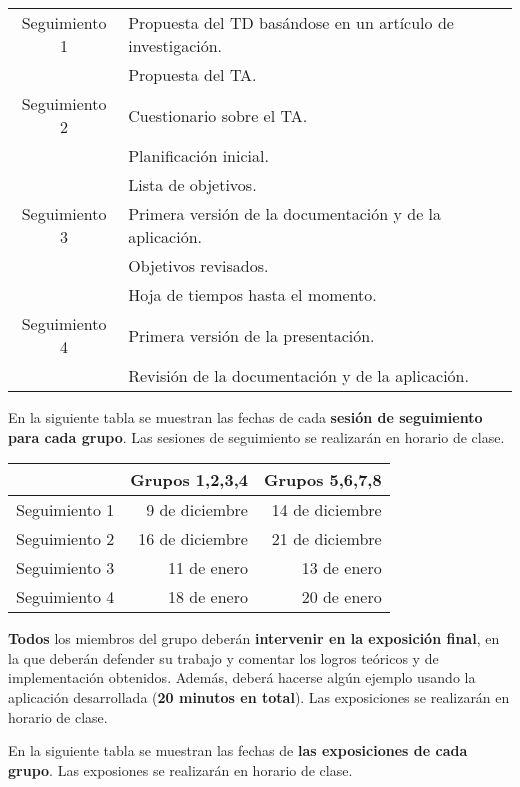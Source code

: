 \documentclass[a4paper]{article}
\begin{document}
    \begin{center}
    \begin{tabular}{|c||l|}
    \hline
  Seguimiento 1 & Propuesta del TD basándose en un artículo de  investigación.  \\
  & Propuesta del TA. \\
\hline
Seguimiento 2  & Cuestionario sobre el TA. \\& Planificación inicial.   \\& Lista de objetivos. \\
\hline
 Seguimiento 3 & Primera versión de la documentación y de la aplicación.\\
& Objetivos revisados. \\&  Hoja de tiempos hasta el momento.\\
\hline
 Seguimiento 4 & Primera versión de la presentación.  \\& Revisión de la documentación  y de la  aplicación.\\
\hline
    \end{tabular}
    \end{center}
    
    En la siguiente tabla se muestran las fechas de cada \textbf{sesión de seguimiento para cada grupo}. Las sesiones de seguimiento se realizarán en horario de clase.
    
     \begin{center}
    \begin{tabular}{|c||r|r|}
    \hline
    & Grupos 1,2,3,4 & Grupos 5,6,7,8\\
    \hline\hline
  Seguimiento 1 & 9 de diciembre & 14 de diciembre\\
\hline
Seguimiento 2  & 16 de diciembre & 21 de diciembre\\
\hline
 Seguimiento 3 &11 de enero & 13 de enero\\
\hline
 Seguimiento 4 & 18 de enero&20 de enero\\
\hline
    \end{tabular}
    \end{center}
    
\textbf{Todos} los miembros del grupo deberán \textbf{intervenir en la exposición final}, en la que deberán defender su trabajo y comentar los logros teóricos y de implementación obtenidos. Además, deberá hacerse algún ejemplo usando la aplicación desarrollada (\textbf{20 minutos en total}). Las exposiciones se realizarán en horario de clase.

    En la siguiente tabla se muestran las fechas de  \textbf{las exposiciones de cada grupo}. Las exposiones se realizarán en horario de clase.
\end{document}
